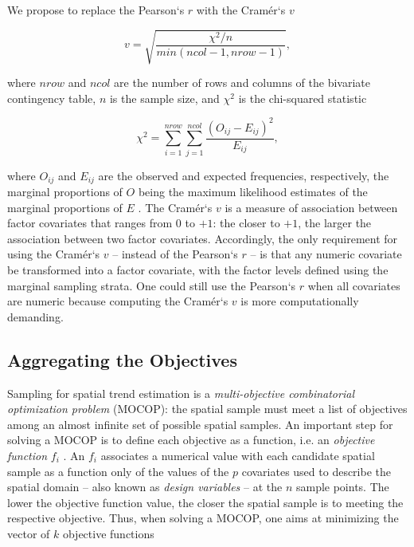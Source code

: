 We propose to replace the Pearson`s $r$ with the Cramér`s $v$

\begin{equation}
 v =  \sqrt{\frac{\chi^2 / n}{min(ncol - 1, nrow - 1)}},
\end{equation}\label{eq:chap08-cramer}

\noindent where $nrow$ and $ncol$ are the number of rows and columns of the bivariate contingency table, 
$n$ is the sample size, and $\chi^2$ is the chi-squared statistic

\begin{equation}
 \chi^2 = \sum_{i = 1}^{nrow}\sum_{j=1}^{ncol}\frac{(O_{ij} - E_{ij})^2}{E_{ij}},
\end{equation}\label{eq:chap08-chi-squared}

\noindent where $O_{ij}$ and $E_{ij}$ are the observed and expected frequencies, respectively, the marginal 
proportions of $O$ being the maximum likelihood estimates of the marginal proportions of $E$ 
\cite{Cramer1946, Agresti2002}. The Cramér`s $v$ is a measure of association between factor covariates that 
ranges from $0$ to $+1$: the closer to $+1$, the larger the association between two factor covariates. 
Accordingly, the only requirement for using the Cramér`s $v$ -- instead of the Pearson`s $r$ -- is that any 
numeric covariate be transformed into a factor covariate, with the factor levels defined using the marginal 
sampling strata. One could still use the Pearson`s $r$ when all covariates are numeric because computing the 
Cramér`s $v$ is more computationally demanding.

\subsection{Aggregating the Objectives}

Sampling for spatial trend estimation is a \emph{multi-objective combinatorial optimization problem} (MOCOP): 
the spatial sample must meet a list of objectives among an almost infinite set of possible 
spatial samples. An important step for solving a MOCOP is to define each objective as a function, i.e. an 
\emph{objective function} $f_i$ \cite{Arora2011}. An $f_i$ associates a numerical value with each candidate 
spatial 
sample as a function only of the values of the $p$ covariates used to describe the spatial domain -- also 
known as \emph{design variables} \cite{Arora2011} -- at the $n$ sample points. The lower the objective 
function value, the closer the spatial sample is to meeting the respective objective. Thus, when solving a 
MOCOP, one aims at minimizing the vector of $k$ objective functions \cite{Arora2011}

